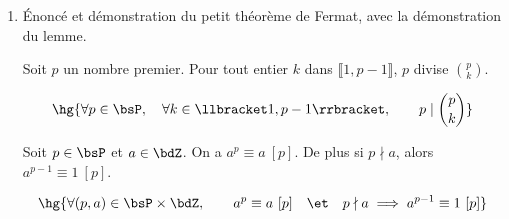 \documentclass[a4paper,french,bookmarks]{article}
\begin{document}
\begin{enumerate}
{        Donc $\qquad a \land b = 1 \iff \exists (u, v) \in \bdZ^2,\qquad au + bv = 1$.
    }
    
    \begin{lemma*}{Lemme de Gauss}{}
        Soit $(a, b, c) \in \bdZ^3$. Si $a$ divise $bc$ et si $a$ et $b$ sont premiers entre eux, alors $a$ divise $c$.
        
        \[ \hg{a \mid bc \ \et a \land b = 1 \implies a \mid c}\]
    \end{lemma*}{}
    
    
    \item Énoncé et démonstration du petit théorème de Fermat, avec la démonstration du lemme.
    
    \begin{lemma*}{}{}
        Soit $p$ un nombre premier. Pour tout entier $k$ dans $\llbracket 1, p-1 \rrbracket$, $p$ divise $\binom{p}{k}$.
        
        \[ \hg{\forall p \in \bsP,\quad \forall k \in \llbracket 1, p-1 \rrbracket,\qquad p \mid \binom{p}{k}}\]
    \end{lemma*}
    
    
    \begin{theorem*}{}{}
        Soit $p \in \bsP$ et $a \in \bdZ$. On a $a^p \equiv a \ [p]$. De plus si $p \nmid a$, alors $a^{p-1} \equiv 1 \ [p]$.
        
        \[ \hg{\forall (p, a) \in \bsP\times\bdZ,\qquad a^p \equiv a \ [p] \quad\et\quad p \nmid a \implies a^{p-1} \equiv 1 \ [p]}\]
    \end{theorem*}
    

\end{enumerate}
\end{document}
